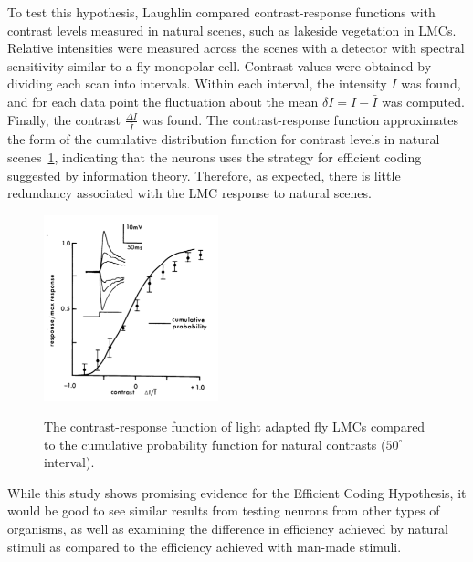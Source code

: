 \documentclass[twoside]{article}
\begin{document}
\begin{multicols}{2}
To test this hypothesis, Laughlin compared contrast-response functions with contrast levels measured in natural scenes, such as lakeside vegetation in LMCs. Relative intensities were measured across the scenes with a detector with spectral sensitivity similar to a fly monopolar cell. Contrast values were obtained by dividing each scan into intervals. Within each interval, the intensity $\bar{I}$ was found, and for each data point the fluctuation about the mean $\delta I = I - \bar{I}$ was computed. Finally, the contrast $\displaystyle\frac{\Delta I}{\bar{I}}$ was found. The contrast-response function approximates the form of the cumulative distribution function for contrast levels in natural scenes~\ref{fig:laughlin1981-fig2}, indicating that the neurons uses the strategy for efficient coding suggested by information theory. Therefore, as expected, there is little redundancy associated with the LMC response to natural scenes. 

\begin{figure}[H]
	\caption{
		The contrast-response function of light adapted fly LMCs compared to the cumulative probability function for natural contrasts ($50^\circ$ interval).
	}
	\includegraphics[width=0.45\textwidth]{laughlin1981-fig2}
	\label{fig:laughlin1981-fig2}
\end{figure}

While this study shows promising evidence for the Efficient Coding Hypothesis, it would be good to see similar results from testing neurons from other types of organisms, as well as examining the difference in efficiency achieved by natural stimuli as compared to the efficiency achieved with man-made stimuli.






\end{multicols}
\end{document}
